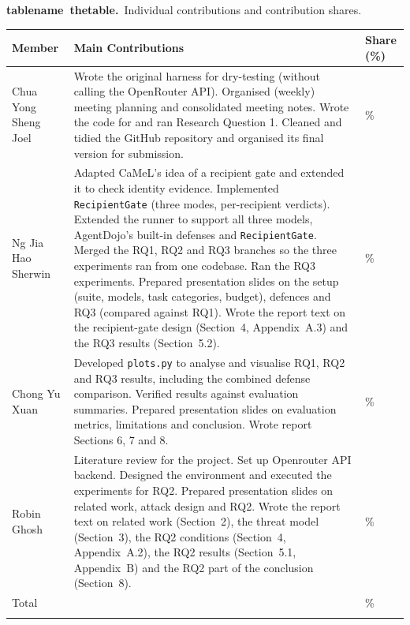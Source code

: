 \documentclass[11pt]{article}
\newcommand{\code}[1]{\texttt{#1}}
\newcommand{\reportcaption}[3]{%
  \par\addvspace{0.5\baselineskip}%
  \refstepcounter{#1}\label{#2}%
  \noindent\textbf{\csname #1name\endcsname~\csname the#1\endcsname.}\ #3\par
}
\begin{document}
\reportcaption{table}{tab:contributions}{Individual contributions and contribution shares.}

\begingroup
\setlength{\tabcolsep}{3pt}
\begin{longtable}{@{}>{\raggedright\arraybackslash}p{}>{\raggedright\arraybackslash}p{}>{\raggedright\arraybackslash}p{}@{}}
\toprule
\textbf{Member} & \textbf{Main Contributions} & \textbf{Share (\%)} \\
\midrule
\endhead
Chua Yong Sheng Joel & Wrote the original harness for dry-testing (without calling the OpenRouter API). Organised (weekly) meeting planning and consolidated meeting notes. Wrote the code for and ran Research Question 1. Cleaned and tidied the GitHub repository and organised its final version for submission. & 25\% \\
\addlinespace[0.3em]
Ng Jia Hao Sherwin & Adapted CaMeL's idea of a recipient gate and extended it to check identity evidence. Implemented \code{RecipientGate} (three modes, per-recipient verdicts). Extended the runner to support all three models, AgentDojo's built-in defenses and \code{RecipientGate}. Merged the RQ1, RQ2 and RQ3 branches so the three experiments ran from one codebase. Ran the RQ3 experiments. Prepared presentation slides on the setup (suite, models, task categories, budget), defences and RQ3 (compared against RQ1). Wrote the report text on the recipient-gate design (Section~4, Appendix~A.3) and the RQ3 results (Section~5.2). & 25\% \\
\addlinespace[0.3em]
Chong Yu Xuan & Developed \code{plots.py} to analyse and visualise RQ1, RQ2 and RQ3 results, including the combined defense comparison. Verified results against evaluation summaries. Prepared presentation slides on evaluation metrics, limitations and conclusion. Wrote report Sections 6, 7 and 8. & 25\% \\
\addlinespace[0.3em]
Robin Ghosh & Literature review for the project. Set up Openrouter API backend. Designed the environment and executed the experiments for RQ2. Prepared presentation slides on related work, attack design and RQ2. Wrote the report text on related work (Section~2), the threat model (Section~3), the RQ2 conditions (Section~4, Appendix~A.2), the RQ2 results (Section~5.1, Appendix~B) and the RQ2 part of the conclusion (Section~8). & 25\% \\
\addlinespace[0.3em]
Total &  & 100\% \\
\addlinespace[0.3em]
\bottomrule
\end{longtable}
\endgroup
\end{document}
